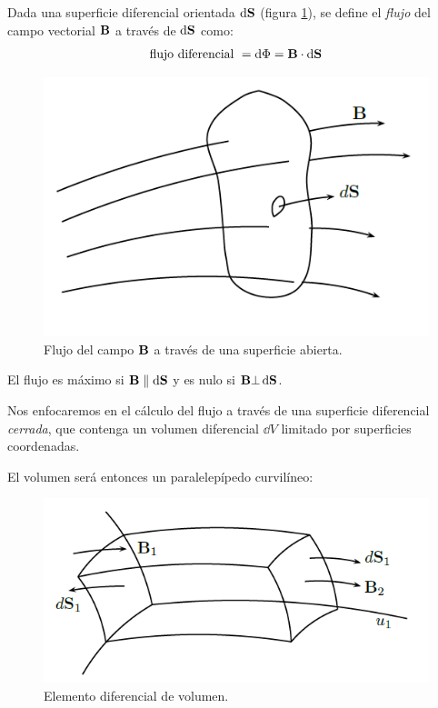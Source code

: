 \documentclass[12pt]{article}
\numberwithin{equation}{section}
\begin{document}
Dada una superficie diferencial orientada $\dd{\vb{S}}$ (figura \ref{fig:figura_superficie_diferencial}), se define el \emph{flujo} del campo vectorial $\vb{B}$ a través de $\dd{\vb{S}}$ como:
\begin{align*}
\mbox{flujo diferencial } = \dd{\Phi} = \vb{B} \cdot \dd{\vb{S}}
\end{align*}

\begin{figure}[H]
    \centering
    \includegraphics[scale=0.5]{Imagenes/Superficie_Diferencial.png}
    \caption{Flujo del campo $\vb{B}$ a través de una superficie abierta.}
    \label{fig:figura_superficie_diferencial}
\end{figure}
El flujo es máximo si $\vb{B} \parallel \dd{\vb{S}}$ y es nulo si $\vb{B} \bot \dd{\vb{S}}$.
\par
Nos enfocaremos en el cálculo del flujo a través de una superficie diferencial \emph{cerrada}, que contenga un volumen diferencial $\dd{V}$ limitado por superficies coordenadas.
\par
El volumen será entonces un paralelepípedo curvilíneo:
\begin{figure}[H]
    \centering
    \includegraphics[scale=0.75]{Imagenes/Diferencial_Volumen.png}
    \caption{Elemento diferencial de volumen.}
    \label{fig:Diferencial_Volumen}
\end{figure}
\end{document}
